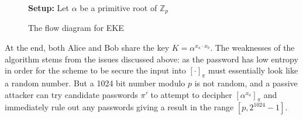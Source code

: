 \documentclass{amsart}
\theoremstyle{remark}
\begin{document}

\begin{figure}[h]
\textbf{Setup:} Let $\alpha$ be a primitive root of $\mathbb{Z}_p$
    \caption{The flow diagram for EKE}
    \label{fig:EKE}
\end{figure}

At the end, both Alice and Bob share the key $K = \alpha^{x_a \cdot x_b}$.  The weaknesses of the algorithm 
stems from the issues discussed above: as the password has low entropy in order for the scheme to be 
secure the input into $[\cdot]_{\pi}$ must essentially look like a random number.  But a 1024 bit number 
modulo $p$ is not random, and a passive attacker can try candidate passwords $\pi'$ to attempt to decipher 
$\left[\alpha^{x_a}\right]_{\pi}$ and immediately rule out any passwords giving a result in the range $[p,2^{1024}-1]$.
\\
\end{document}
